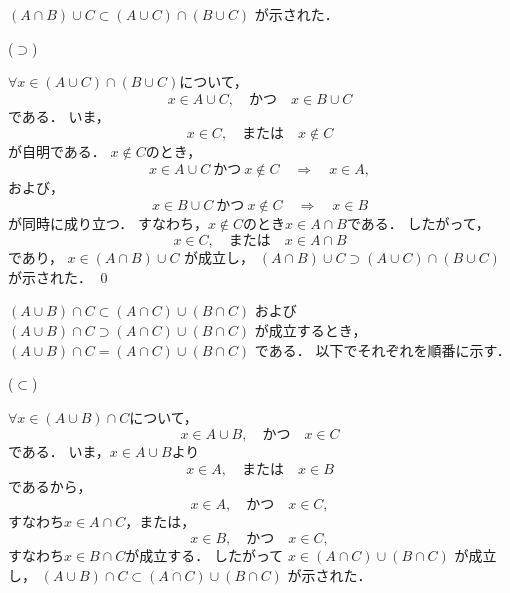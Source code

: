 \documentclass[uplatex,11pt]{jsarticle}
\def\shoumon#1{\vspace{1em}\noindent\ovalbox{\textsf{ #1 }}}
\begin{document}
$(A \cap B) \cup C \subset (A \cup C) \cap (B \cup C)$
が示された．

($\supset$)

$\forall x \in (A \cup C) \cap (B \cup C)$について，
\begin{equation*}
	x \in A \cup C,
	\quad \text{かつ} \quad
	x \in B \cup C
\end{equation*}
である．
いま，
\begin{equation*}
	x \in C,
	\quad \text{または} \quad
	x \not\in C
\end{equation*}
が自明である．
$x \not\in C$のとき，
\begin{equation*}
	x \in A \cup C
	\ \text{かつ}\ 
	x \not\in C
	\quad \Longrightarrow \quad
	x \in A,
\end{equation*}
および，
\begin{equation*}
	x \in B \cup C
	\ \text{かつ}\ 
	x \not\in C
	\quad \Longrightarrow \quad
	x \in B
\end{equation*}
が同時に成り立つ．
すなわち，$x \not\in C$のとき$x \in A \cap B$である．
したがって，
\begin{equation*}
	x \in C,
	\quad \text{または} \quad
	x \in A \cap B
\end{equation*}
であり，
$x \in (A \cap B) \cup C$
が成立し，
$(A \cap B) \cup C \supset (A \cup C) \cap (B \cup C)$
が示された．
\qed


\shoumon{分配律 2}

$(A \cup B) \cap C \subset (A \cap C) \cup (B \cap C)$
および
$(A \cup B) \cap C \supset (A \cap C) \cup (B \cap C)$
が成立するとき，
$(A \cup B) \cap C = (A \cap C) \cup (B \cap C)$
である．
以下でそれぞれを順番に示す．

($\subset$)

$\forall x \in (A \cup B) \cap C$について，
\begin{equation*}
	x \in A \cup B,
	\quad \text{かつ} \quad
	x \in C
\end{equation*}
である．
いま，$x \in A \cup B$より
\begin{equation*}
	x \in A,
	\quad \text{または} \quad
	x \in B
\end{equation*}
であるから，
\begin{equation*}
	x \in A,
	\quad \text{かつ} \quad
	x \in C,
\end{equation*}
すなわち$x \in A \cap C$，または，
\begin{equation*}
	x \in B,
	\quad \text{かつ} \quad
	x \in C,
\end{equation*}
すなわち$x \in B \cap C$が成立する．
したがって
$x \in (A \cap C) \cup (B \cap C)$
が成立し，
$(A \cup B) \cap C \subset (A \cap C) \cup (B \cap C)$
が示された．
\end{document}
